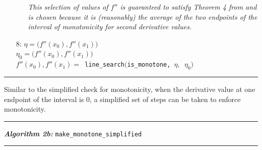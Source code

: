 \documentclass{scspaperproc}
\theoremstyle{scsthe}
\begin{document}
\begin{itemize}
  \begin{itemize}
    \item[] \textit{This selection of values of $f''$ is guaranteed to satisfy Theorem 4 from \cite{ulrich1994positivity} and is chosen because it is (reasonably) the average of the two endpoints of the interval of monotonicity for second derivative values.}
  \end{itemize}

\item[8:] $\eta = \big(f''(x_0), f''(x_1)\big)$\\$\eta_0 = \big(\hat f''(x_0), f''(x_1)\big)$\\$f''(x_0), f''(x_1) = $\texttt{ line\_search$\big($is\_monotone, $\eta,$ $\eta_0\big)$}
\end{itemize}
\hrule
\vspace{10pt}


Similar to the simplified check for monotonicity, when the derivative value at one endpoint of the interval is $0$, a simplified set of steps can be taken to enforce monotonicity.

\vspace{10pt}%
\hrule%
\vspace{3pt}%
\noindent\textbf{\textit{Algorithm 2b:}} \texttt{make\_monotone\_simplified}%
\vspace{3pt}%
\hrule%
\end{document}

